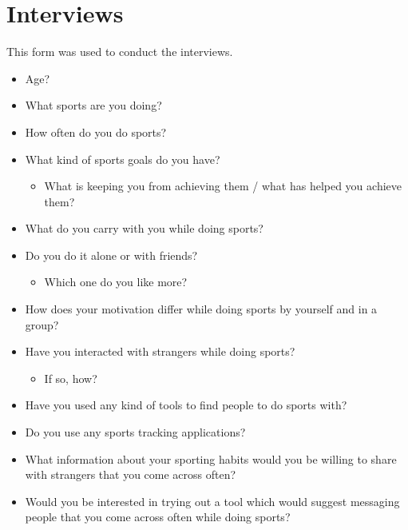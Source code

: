 \section{Interviews}
\label{sec:app1_1}

This form was used to conduct the interviews.

\begin{itemize}
	\item Age?
	\item What sports are you doing?
	\item How often do you do sports?
	\item What kind of sports goals do you have?
		\begin{itemize}
			\item What is keeping you from achieving them / what has helped you achieve them?
		\end{itemize}
	\item What do you carry with you while doing sports?
	\item Do you do it alone or with friends?
		\begin{itemize}
			\item Which one do you like more?
		\end{itemize}
	\item How does your motivation differ while doing sports by yourself and in a group?
	\item Have you interacted with strangers while doing sports?
		\begin{itemize}
			\item If so, how?
		\end{itemize}
	\item Have you used any kind of tools to find people to do sports with?
	\item Do you use any sports tracking applications?
	\item What information about your sporting habits would you be willing to share with strangers that you come across often?
	\item Would you be interested in trying out a tool which would suggest messaging people that you come across often while doing sports?
\end{itemize}

%
%
%
%

